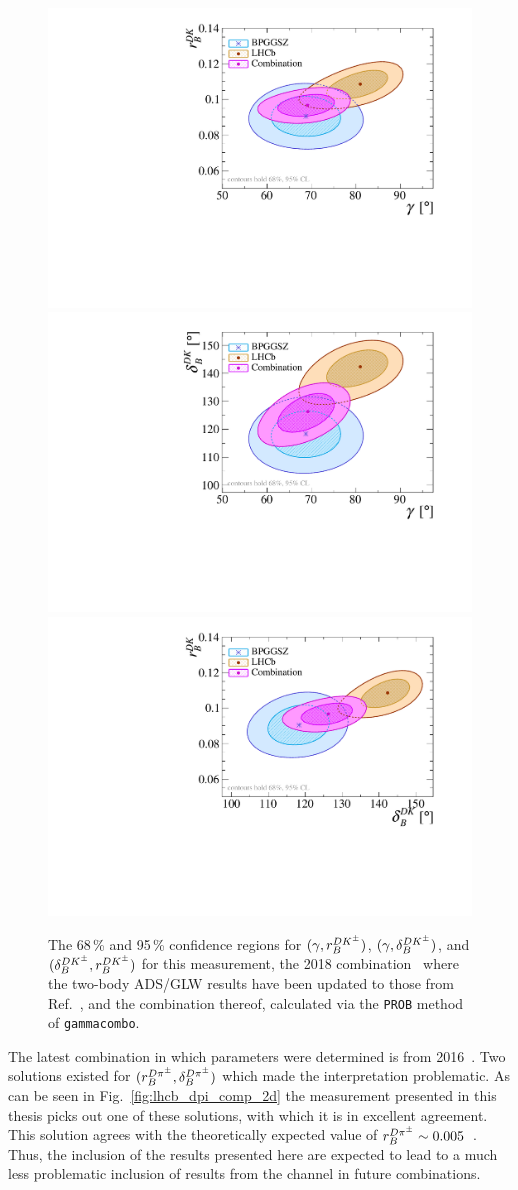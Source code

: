 \begin{figure}[tp]
    \centering
    \includegraphics[width=0.45\columnwidth]{figures/analysis/interpretation/2d_g_r_dk_vs_old_lhcb_prob.pdf}
    \includegraphics[width=0.45\columnwidth]{figures/analysis/interpretation/2d_g_d_dk_vs_old_lhcb_prob.pdf}
    \includegraphics[width=0.45\columnwidth]{figures/analysis/interpretation/2d_d_dk_r_dk_vs_old_lhcb_prob.pdf}
    \caption{The 68\,\% and 95\,\% confidence regions  for $(\gamma, r_B^{{{D}{{K}^\pm}}})$, $(\gamma, \delta_B^{{{D}{{K}^\pm}}})$, and $(\delta_B^{{{D}{{K}^\pm}}}, r_B^{{{D}{{K}^\pm}}})$ for this measurement, the 2018 \lhcb combination~\cite{LHCb-CONF-2018-002} where the two-body ADS/GLW results have been updated to those from Ref.~\cite{LHCb-ANA-2020-024}, and the combination thereof, calculated via the \texttt{PROB} method of \texttt{gammacombo}.}
    \label{fig:lhcb_dk_comp_2d}
\end{figure}



The latest \lhcb combination in which \BtoDpi parameters were determined is from 2016~\cite{LHCb-PAPER-2016-032}. Two solutions existed for $(r_B^{D\pi^\pm}, \delta_B^{D\pi^\pm})$ which made the interpretation problematic. As can be seen in Fig.~\ref{fig:lhcb_dpi_comp_2d} the measurement presented in this thesis picks out one of these solutions, with which it is in excellent agreement. This solution agrees with the theoretically expected value of $r_B^{D\pi^\pm}\sim 0.005$~\cite{rDpiPaper}. Thus, the inclusion of the results presented here are expected to lead to a much less problematic inclusion of results from the \BtoDpi channel in future \lhcb combinations.

